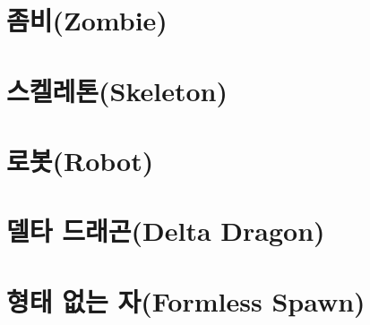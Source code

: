 \documentclass{report}
\begin{document}
	\hypertarget{species:zombie}{}
	\section{좀비(Zombie)}
		
	
	\hypertarget{species:skeleton}{}
	\section{스켈레톤(Skeleton)}
		
		
	\section{로봇(Robot)}
		
	
	\section{델타 드래곤(Delta Dragon)}
		
	
	\section{형태 없는 자(Formless Spawn)}
		
	
\end{document}
